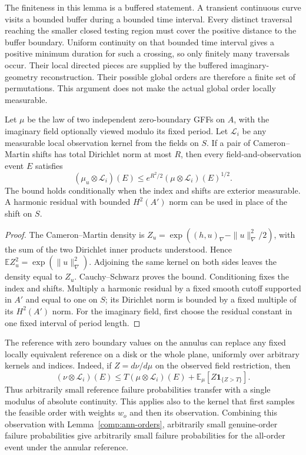The finiteness in this lemma is a buffered statement.  A transient
continuous curve visits a bounded buffer during a bounded time interval.
Every distinct traversal reaching the smaller closed testing region must
cover the positive distance to the buffer boundary.  Uniform continuity
on that bounded time interval gives a positive minimum duration for
such a crossing, so only finitely many traversals occur.  Their local
directed pieces are supplied by the buffered imaginary-geometry
reconstruction.  Their possible global orders are therefore a finite
set of permutations.  This argument does not make the actual global
order locally measurable.

\begin{lemma}\label{comp:ann-likelihood}
Let $\mu$ be the law of two independent zero-boundary GFFs on $A$, with
the imaginary field optionally viewed modulo its fixed period.  Let
$\mathcal L_i$ be any measurable local observation kernel from the
fields on $S$.  If a pair of Cameron--Martin shifts has total Dirichlet
norm at most $R$, then every field-and-observation event $E$ satisfies
\begin{equation}\label{comp:ann-likelihood-bound}
 (\mu_u\otimes\mathcal L_i)(E)
 \leq e^{R^2/2}(\mu\otimes\mathcal L_i)(E)^{1/2}.
\end{equation}
The bound holds conditionally when the index and shifts are exterior
measurable.  A harmonic residual with bounded $H^2(A')$ norm can be used
in place of the shift on $S$.
\end{lemma}

\begin{proof}
The Cameron--Martin density is
$Z_u=\exp((h,u)_\nabla-\|u\|_\nabla^2/2)$, with the sum of the two
Dirichlet inner products understood.  Hence
$\mathbb E Z_u^2=\exp(\|u\|_\nabla^2)$.
Adjoining the same kernel on both sides leaves the density equal to
$Z_u$.  Cauchy--Schwarz proves the bound.  Conditioning fixes the
index and shifts.  Multiply a harmonic residual by a fixed smooth cutoff
supported in $A'$ and equal to one on $S$; its Dirichlet norm is bounded
by a fixed multiple of its $H^2(A')$ norm.  For the imaginary field, first
choose the residual constant in one fixed interval of period length.
\end{proof}

The reference with zero boundary values on the annulus can replace any
fixed locally equivalent reference on a disk or the whole plane, uniformly over arbitrary
kernels and indices.  Indeed, if $Z=d\nu/d\mu$ on the observed field
restriction, then
\begin{equation}\label{comp:ann-reference-change}
 (\nu\otimes\mathcal L_i)(E)
 \leq T(\mu\otimes\mathcal L_i)(E)
       +\mathbb E_\mu[Z\mathbf1_{\{Z>T\}}].
\end{equation}
Thus arbitrarily small reference failure probabilities transfer with a
single modulus of absolute continuity.  This applies also to the kernel
that first samples the feasible order with weights $w_o$ and then its
observation.  Combining this observation with
Lemma~\ref{comp:ann-orders}, arbitrarily small genuine-order failure
probabilities give arbitrarily small failure probabilities for the
all-order event under the annular reference.

